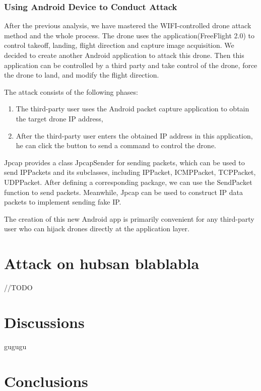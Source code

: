 \documentclass{acm_proc_article-sp}
\begin{document}
\subsubsection{Using Android Device to Conduct Attack}

After the previous analysis, we have mastered the WIFI-controlled drone attack method and the whole process. The drone uses the application(FreeFlight 2.0) to control takeoff, landing, flight direction and capture image acquisition. We decided to create another Android application to attack this drone. Then this application can be controlled by a third party and take control of the drone, force the drone to land, and modify the flight direction.

The attack consists of the following phases:

\begin{enumerate}
  \item The third-party user uses the Android packet capture application to obtain the target drone IP address,
  \item After the third-party user enters the obtained IP address in this application, he can click the button to send a command to control the drone.
\end{enumerate}


Jpcap provides a class JpcapSender for sending packets, which can be used to send IPPackets and its subclasses, including IPPacket, ICMPPacket, TCPPacket, UDPPacket\cite{jpcap}. After defining a corresponding package, we can use the SendPacket function to send packets. Meanwhile, Jpcap can be used to construct IP data packets to implement sending fake IP.

The creation of this new Android app is primarily convenient for any third-party user who can hijack drones directly at the application layer.



\section{Attack on hubsan blablabla}

//TODO

\section{Discussions}

gugugu


\section{Conclusions}
\end{document}
